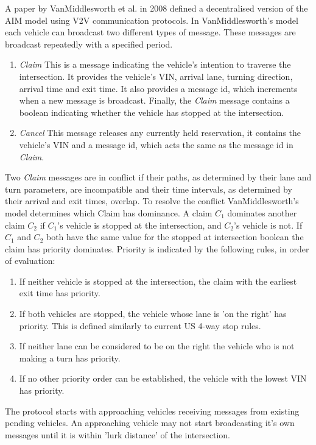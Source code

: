A paper by VanMiddlesworth et al. in 2008 \citep{VanMiddlesworth2008} defined a decentralised version of the AIM model using V2V communication protocols. In VanMiddlesworth's model each vehicle can broadcast two different types of message. These messages are broadcast repeatedly with a specified period.
\begin{enumerate}
\item \emph{Claim}
This is a message indicating the vehicle's intention to traverse the intersection. It provides the vehicle's VIN, arrival lane, turning direction, arrival time and exit time. It also provides a message id, which increments when a new message is broadcast. Finally, the \emph{Claim} message contains a boolean indicating whether the vehicle has stopped at the intersection.
\item \emph{Cancel}
This message releases any currently held reservation, it contains the vehicle's VIN and a message id, which acts the same as the message id in \emph{Claim}.
\end{enumerate}

Two \emph{Claim} messages are in conflict if their paths, as determined by their lane and turn parameters, are incompatible and their time intervals, as determined by their arrival and exit times, overlap. To resolve the conflict VanMiddlesworth's model determines which Claim has dominance. A claim $C_1$ dominates another claim $C_2$ if $C_1$'s vehicle is stopped at the intersection, and $C_2$'s vehicle is not. If $C_1$ and $C_2$ both have the same value for the stopped at intersection boolean the claim has priority dominates. Priority is indicated by the following rules, in order of evaluation:
\begin{enumerate}
\item If neither vehicle is stopped at the intersection, the claim with the earliest exit time has priority.
\item If both vehicles are stopped, the vehicle whose lane is 'on the right' has priority. This is defined similarly to current US 4-way stop rules.
\item If neither lane can be considered to be on the right the vehicle who is not making a turn has priority.
\item If no other priority order can be established, the vehicle with the lowest VIN has priority.
\end{enumerate}

The protocol starts with approaching vehicles receiving messages from existing pending vehicles. An approaching vehicle may not start broadcasting it's own messages until it is within 'lurk distance' of the intersection. 

